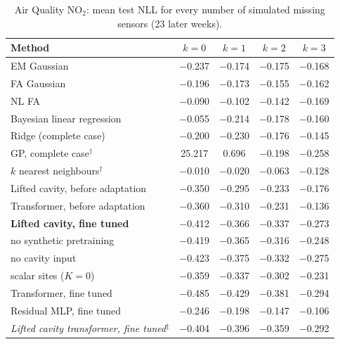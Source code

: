 \begin{table}[t]
\centering\small
\caption{\label{tab:moreairqno2}Air Quality NO$_2$: mean test NLL for every number of simulated missing sensors (23 later weeks).}
\begin{tabular}{lcccc}
\toprule
Method & $k{=}0$ & $k{=}1$ & $k{=}2$ & $k{=}3$\\
\midrule
EM Gaussian & $-$0.237 & $-$0.174 & $-$0.175 & $-$0.168\\
FA Gaussian & $-$0.196 & $-$0.173 & $-$0.155 & $-$0.162\\
NL FA & $-$0.090 & $-$0.102 & $-$0.142 & $-$0.169\\
Bayesian linear regression & $-$0.055 & $-$0.214 & $-$0.178 & $-$0.160\\
Ridge (complete case) & $-$0.200 & $-$0.230 & $-$0.176 & $-$0.145\\
GP, complete case$^\dagger$ & 25.217 & 0.696 & $-$0.198 & $-$0.258\\
$k$ nearest neighbours$^\dagger$ & $-$0.010 & $-$0.020 & $-$0.063 & $-$0.128\\
Lifted cavity, before adaptation & $-$0.350 & $-$0.295 & $-$0.233 & $-$0.176\\
Transformer, before adaptation & $-$0.360 & $-$0.310 & $-$0.231 & $-$0.136\\
\textbf{Lifted cavity, fine tuned} & $-$0.412 & $-$0.366 & $-$0.337 & $-$0.273\\
\quad no synthetic pretraining & $-$0.419 & $-$0.365 & $-$0.316 & $-$0.248\\
\quad no cavity input & $-$0.423 & $-$0.375 & $-$0.332 & $-$0.275\\
\quad scalar sites ($K=0$) & $-$0.359 & $-$0.337 & $-$0.302 & $-$0.231\\
Transformer, fine tuned & $-$0.485 & $-$0.429 & $-$0.381 & $-$0.294\\
Residual MLP, fine tuned & $-$0.246 & $-$0.198 & $-$0.147 & $-$0.106\\
\emph{Lifted cavity transformer, fine tuned}$^\ddagger$ & $-$0.404 & $-$0.396 & $-$0.359 & $-$0.292\\
\bottomrule
\end{tabular}
\end{table}
